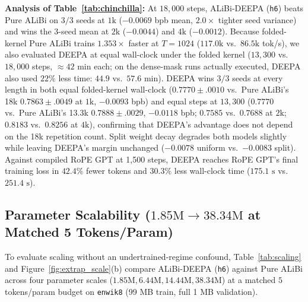 \documentclass[10pt,a4paper]{article}
\begin{document}
\noindent\textbf{Analysis of Table~\ref{tab:chinchilla}:} At $18,000$ steps, ALiBi-DEEPA (\texttt{h6}) beats Pure ALiBi on $3/3$ seeds at $1\text{k}$ ($-0.0069$ bpb mean, $2.0\times$ tighter seed variance) and wins the 3-seed mean at $2\text{k}$ ($-0.0044$) and $4\text{k}$ ($-0.0012$). Because folded-kernel Pure ALiBi trains $1.353\times$ faster at $T=1024$ ($117.0\text{k}$ vs.\ $86.5\text{k}$ tok/s), we also evaluated DEEPA at equal wall-clock under the folded kernel ($13{,}300$ vs.\ $18{,}000$ steps, $\approx 42\text{ min}$ each; on the dense-mask runs actually executed, DEEPA also used $22\%$ less time: $44.9$ vs.\ $57.6\text{ min}$). DEEPA wins $3/3$ seeds at every length in both equal folded-kernel wall-clock ($0.7770 \pm .0010$ vs.\ Pure ALiBi's 18k $0.7863 \pm .0049$ at $1\text{k}$, $-0.0093$ bpb) and equal steps at $13{,}300$ ($0.7770$ vs.\ Pure ALiBi's 13.3k $0.7888 \pm .0029$, $-0.0118$ bpb; $0.7585$ vs.\ $0.7688$ at $2\text{k}$; $0.8183$ vs.\ $0.8256$ at $4\text{k}$), confirming that DEEPA's advantage does not depend on the 18k repetition count. Split weight decay degrades both models slightly while leaving DEEPA's margin unchanged ($-0.0078$ uniform vs.\ $-0.0083$ split). Against compiled RoPE GPT at 1,500 steps, DEEPA reaches RoPE GPT's final training loss in $42.4\%$ fewer tokens and $30.3\%$ less wall-clock time ($175.1\text{ s}$ vs.\ $251.4\text{ s}$).

\subsection{Parameter Scalability ($1.85\text{M} \to 38.34\text{M}$ at Matched 5 Tokens/Param)}
To evaluate scaling without an undertrained-regime confound, Table~\ref{tab:scaling} and Figure~\ref{fig:extrap_scale}(b) compare ALiBi-DEEPA (\texttt{h6}) against Pure ALiBi across four parameter scales ($1.85\text{M}, 6.44\text{M}, 14.44\text{M}, 38.34\text{M}$) at a matched $5$ tokens/param budget on \texttt{enwik8} (99 MB train, full 1 MB validation).
\end{document}
